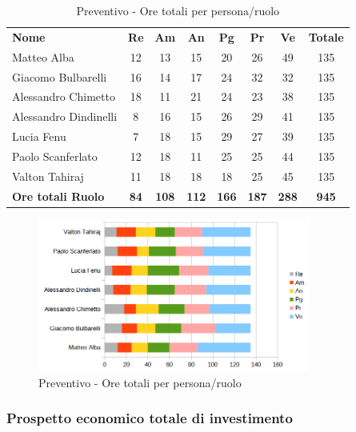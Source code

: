 		\begin{table} [h!]
			\begin{center}
				\begin{tabular} { m{3.5cm} c c c c c c c }
					\rowcolor{lightgray}
					\textbf{Nome} & \textbf{Re} & \textbf{Am} & \textbf{An} & \textbf{Pg} & \textbf{Pr} & \textbf{Ve} & \textbf{Totale} \\
					Matteo Alba & 12 & 13 & 15 & 20 & 26& 49 & 135 \\
					Giacomo Bulbarelli & 16 & 14 & 17 & 24 & 32 & 32 & 135 \\
					Alessandro Chimetto & 18 & 11 & 21 & 24 & 23 & 38 & 135 \\
					Alessandro Dindinelli & 8 & 16 & 15 & 26 & 29 & 41 & 135 \\
					Lucia Fenu & 7 & 18 & 15 & 29 & 27 & 39 & 135 \\
					Paolo Scanferlato & 12 & 18 & 11 & 25 & 25 & 44 & 135 \\
					Valton Tahiraj & 11 & 18 & 18 & 18 & 25 & 45 & 135 \\
					\textbf{Ore totali Ruolo} & \textbf{84} & \textbf{108} & \textbf{112} & \textbf{166} & \textbf{187}& \textbf{288} & \textbf{945}
				\end{tabular}
				\caption{Preventivo - Ore totali per persona/ruolo}
			\end{center}
		\end{table}
	
		\begin{figure} [h!]
			\centering
			\includegraphics[width=0.8\textwidth]{res/img/preventivi/totNONrend-barre.png}
			\caption{Preventivo - Ore totali per persona/ruolo} 
		\end{figure}
	
	\newpage
	
	\subsubsection{Prospetto economico totale di investimento}
	
